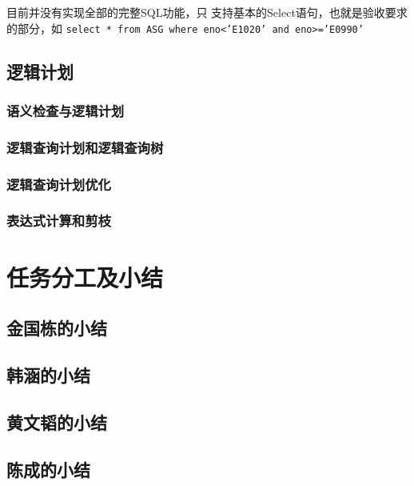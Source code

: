 \documentclass[a4paper, 12pt]{ctexart}
\begin{document}
目前并没有实现全部的完整SQL功能，只
支持基本的Select语句，也就是验收要求的部分，如
\lstinline|select * from ASG where eno<’E1020’ and eno>=’E0990’| 





\subsection{逻辑计划}
\subsubsection{语义检查与逻辑计划}

\subsubsection{逻辑查询计划和逻辑查询树}
\subsubsection{逻辑查询计划优化}
\subsubsection{表达式计算和剪枝}

\section{任务分工及小结}

\subsection{金国栋的小结}

\subsection{韩涵的小结}

\subsection{黄文韬的小结}

\subsection{陈成的小结}





 
\end{document}
